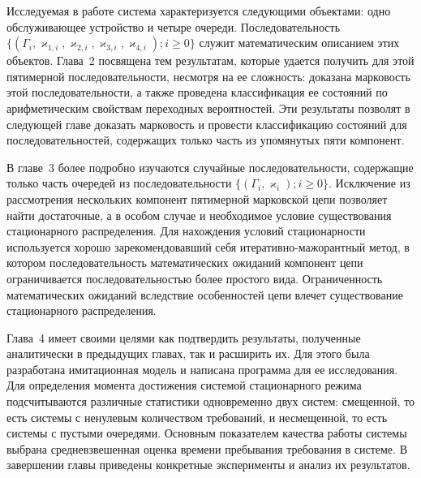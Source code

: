Исследуемая в работе система характеризуется следующими объектами: одно обслуживающее устройство и четыре очереди. Последовательность \linebreak 
 $\{(\Gamma_i, \varkappa_{1,i}, \varkappa_{2,i}, \varkappa_{3,i},  \varkappa_{4,i}); i \geqslant 0\}$ служит математическим описанием этих объектов. Глава~2 посвящена тем результатам, которые удается получить для этой пятимерной последовательности, несмотря на ее сложность: доказана марковость этой последовательности, а также проведена классификация ее состояний по арифметическим свойствам переходных вероятностей. Эти результаты позволят в следующей главе доказать марковость и провести классификацию состояний для последовательностей, содержащих только часть из упомянутых пяти компонент.


В главе~3 более подробно изучаются случайные последовательности, содержащие только часть очередей из последовательности $\{(\Gamma_i, \varkappa_i);  i \geqslant 0\}$. Исключение из рассмотрения нескольких компонент пятимерной марковской цепи позволяет найти достаточные, а в особом случае и необходимое условие существования стационарного распределения. Для нахождения условий стационарности используется хорошо зарекомендовавший себя итеративно-мажорантный метод, в котором последовательность математических ожиданий компонент цепи ограничивается последовательностью более простого вида.
Ограниченность математических ожиданий вследствие особенностей цепи влечет существование стационарного распределения.


Глава~4 имеет своими целями как подтвердить результаты, полученные аналитически в предыдущих главах, так и расширить их. Для этого  была разработана имитационная модель и написана программа для ее исследования. Для определения момента достижения системой стационарного режима подсчитываются различные статистики одновременно двух систем: смещенной, то есть системы с ненулевым количеством требований, и несмещенной, то есть системы с пустыми очередями. Основным показателем качества работы системы выбрана средневзвешенная оценка времени пребывания требования в системе. В завершении главы приведены конкретные эксперименты и анализ их результатов.





